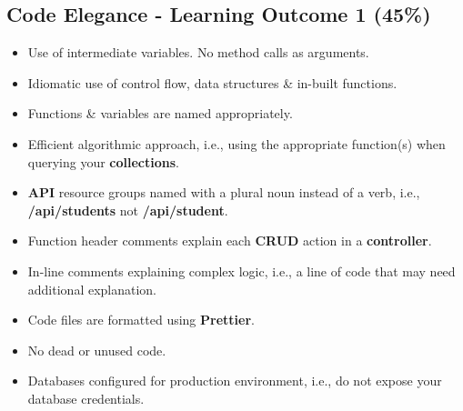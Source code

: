\documentclass{article}
\begin{document}
\subsection*{Code Elegance - Learning Outcome 1 (45\%)}
\begin{itemize}
    \item Use of intermediate variables. No method calls as arguments.
    \item Idiomatic use of control flow, data structures \& in-built functions.
    \item Functions \& variables are named appropriately.
    \item Efficient algorithmic approach, i.e., using the appropriate function(s) when querying your \textbf{collections}.
    \item \textbf{API} resource groups named with a plural noun instead of a verb, i.e., \textbf{/api/students} not \textbf{/api/student}. 
    \item Function header comments explain each \textbf{CRUD} action in a \textbf{controller}.
    \item In-line comments explaining complex logic, i.e., a line of code that may need additional explanation.
    \item Code files are formatted using \textbf{Prettier}.
    \item No dead or unused code.
    \item Databases configured for production environment, i.e., do not expose your database credentials.
\end{itemize} 
\end{document}
